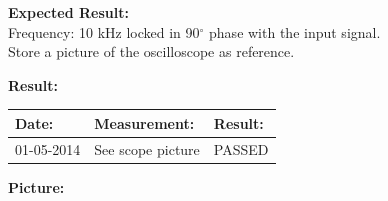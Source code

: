 \begin{figure}[H]
	\centering
\end{figure}

\textbf{Expected Result:}\\
Frequency: 10 kHz locked in 90$^\circ$ phase with the input signal.\\
Store a picture of the oscilloscope as reference.


\textbf{Result:}
\begin{table}[H]
	\centering
	\begin{tabular}{|p{2cm}|p{3cm}|p{2cm}|}\hline
		\textbf{Date:} & \textbf{Measurement:} & \textbf{Result:} \\ \hline
	 	01-05-2014 & See scope picture & PASSED \\ \hline
	\end{tabular}
\end{table}
\textbf{Picture:}

